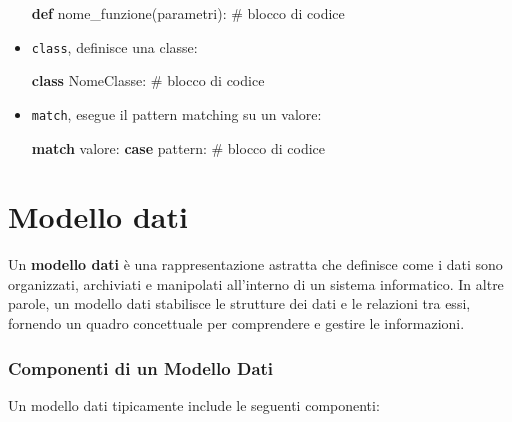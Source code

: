 \documentclass[
  letterpaper,
]{scrbook}
\newenvironment{Shaded}{\begin{snugshade}}{\end{snugshade}}
\newcommand{\CommentTok}[1]{\textcolor[rgb]{0.37,0.37,0.37}{#1}}
\newcommand{\ControlFlowTok}[1]{\textcolor[rgb]{0.00,0.23,0.31}{\textbf{#1}}}
\newcommand{\KeywordTok}[1]{\textcolor[rgb]{0.00,0.23,0.31}{\textbf{#1}}}
\newcommand{\NormalTok}[1]{\textcolor[rgb]{0.00,0.23,0.31}{#1}}
\begin{document}
\begin{itemize}
\begin{Shaded}
\begin{Highlighting}[]
\KeywordTok{def}\NormalTok{ nome\_funzione(parametri):}
    \CommentTok{\# blocco di codice}
\end{Highlighting}
\end{Shaded}
\item
  \texttt{class}, definisce una classe:

\begin{Shaded}
\begin{Highlighting}[]
\KeywordTok{class}\NormalTok{ NomeClasse:}
    \CommentTok{\# blocco di codice}
\end{Highlighting}
\end{Shaded}
\item
  \texttt{match}, esegue il pattern matching su un valore:

\begin{Shaded}
\begin{Highlighting}[]
\ControlFlowTok{match}\NormalTok{ valore:}
    \ControlFlowTok{case}\NormalTok{ pattern:}
        \CommentTok{\# blocco di codice}
\end{Highlighting}
\end{Shaded}
\end{itemize}

\chapter{Modello dati}\label{modello-dati-1}

Un \textbf{modello dati} è una rappresentazione astratta che definisce
come i dati sono organizzati, archiviati e manipolati all'interno di un
sistema informatico. In altre parole, un modello dati stabilisce le
strutture dei dati e le relazioni tra essi, fornendo un quadro
concettuale per comprendere e gestire le informazioni.

\subsection{Componenti di un Modello
Dati}\label{componenti-di-un-modello-dati}

Un modello dati tipicamente include le seguenti componenti:
\end{document}
